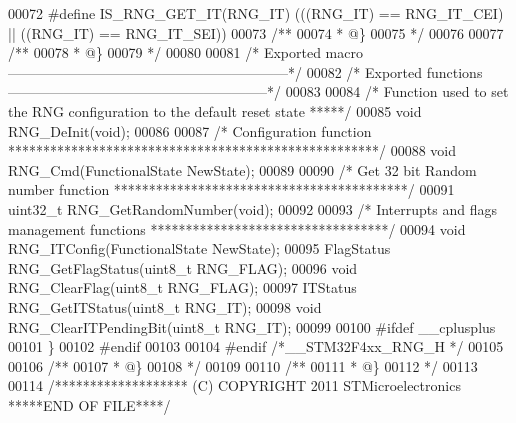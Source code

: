 \begin{DoxyCode}
00072 \textcolor{preprocessor}{#}\textcolor{preprocessor}{define} \textcolor{preprocessor}{IS\_RNG\_GET\_IT}\textcolor{preprocessor}{(}\textcolor{preprocessor}{RNG\_IT}\textcolor{preprocessor}{)} \textcolor{preprocessor}{(}\textcolor{preprocessor}{(}\textcolor{preprocessor}{(}\textcolor{preprocessor}{RNG\_IT}\textcolor{preprocessor}{)} \textcolor{preprocessor}{==} RNG_IT_CEI\textcolor{preprocessor}{)} \textcolor{preprocessor}{||} \textcolor{preprocessor}{(}\textcolor{preprocessor}{(}\textcolor{preprocessor}{RNG\_IT}\textcolor{preprocessor}{)} \textcolor{preprocessor}{==} 
      RNG_IT_SEI\textcolor{preprocessor}{)}\textcolor{preprocessor}{)}
00073 \textcolor{comment}{/**}
00074 \textcolor{comment}{  * @\}}
00075 \textcolor{comment}{  */}
00076 
00077 \textcolor{comment}{/**}
00078 \textcolor{comment}{  * @\}}
00079 \textcolor{comment}{  */}
00080 
00081 \textcolor{comment}{/* Exported macro ------------------------------------------------------------*/}
00082 \textcolor{comment}{/* Exported functions --------------------------------------------------------*/}
00083 
00084 \textcolor{comment}{/*  Function used to set the RNG configuration to the default reset state *****/}
00085 \textcolor{keywordtype}{void} RNG_DeInit(\textcolor{keywordtype}{void});
00086 
00087 \textcolor{comment}{/* Configuration function *****************************************************/}
00088 \textcolor{keywordtype}{void} RNG_Cmd(FunctionalState NewState);
00089 
00090 \textcolor{comment}{/* Get 32 bit Random number function ******************************************/}
00091 uint32\_t RNG_GetRandomNumber(\textcolor{keywordtype}{void});
00092 
00093 \textcolor{comment}{/* Interrupts and flags management functions **********************************/}
00094 \textcolor{keywordtype}{void} RNG_ITConfig(FunctionalState NewState);
00095 FlagStatus RNG_GetFlagStatus(uint8\_t RNG\_FLAG);
00096 \textcolor{keywordtype}{void} RNG_ClearFlag(uint8\_t RNG\_FLAG);
00097 ITStatus RNG_GetITStatus(uint8\_t RNG\_IT);
00098 \textcolor{keywordtype}{void} RNG_ClearITPendingBit(uint8\_t RNG\_IT);
00099 
00100 \textcolor{preprocessor}{#}\textcolor{preprocessor}{ifdef} \_\_cplusplus
00101 \}
00102 \textcolor{preprocessor}{#}\textcolor{preprocessor}{endif}
00103 
00104 \textcolor{preprocessor}{#}\textcolor{preprocessor}{endif} \textcolor{comment}{/*\_\_STM32F4xx\_RNG\_H */}
00105 
00106 \textcolor{comment}{/**}
00107 \textcolor{comment}{  * @\}}
00108 \textcolor{comment}{  */}
00109 
00110 \textcolor{comment}{/**}
00111 \textcolor{comment}{  * @\}}
00112 \textcolor{comment}{  */}
00113 
00114 \textcolor{comment}{/******************* (C) COPYRIGHT 2011 STMicroelectronics *****END OF FILE****/}
\end{DoxyCode}
